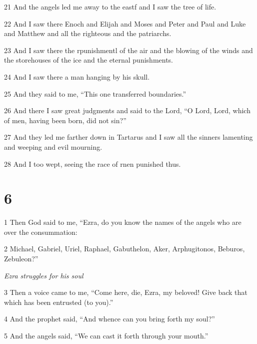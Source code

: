 \par 21 And the angels led me away to the eastf and I saw the tree of life.

\par 22 And I saw there Enoch and Elijah and Moses and Peter and Paul and Luke and Matthew and all the righteous and the patriarchs.

\par 23 And I saw there the rpunishmentl of the air and the blowing of the winds and the storehouses of the ice and the eternal punishments.

\par 24 And I saw there a man hanging by his skull. 

\par 25 And they said to me, “This one transferred boundaries.”

\par 26 And there I saw great judgments and said to the Lord, “O Lord, Lord, which of men, having been born, did not sin?”

\par 27 And they led me farther down in Tartarus and I saw all the sinners lamenting and weeping and evil mourning.

\par 28 And I too wept, seeing the race of rnen punished thus.

\chapter{6}

\par 1 Then God said to me, “Ezra, do you know the names of the angels who are over the consummation:

\par 2 Michael, Gabriel, Uriel, Raphael, Gabuthelon, Aker, Arphugitonos, Beburos, Zebuleon?”

\par \textit{Ezra struggles for his soul}

\par 3 Then a voice came to me, “Come here, die, Ezra, my beloved! Give back that which has been entrusted (to you).”

\par 4 And the prophet said, “And whence can you bring forth my soul?”

\par 5 And the angels said, “We can cast it forth through your mouth.”

